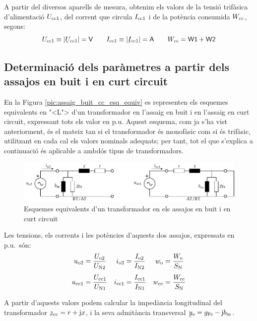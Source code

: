A partir del diversos aparells de mesura, obtenim els valors de la
tensi\'{o} trif\`{a}sica d'alimentaci\'{o} $U_\mathrm{cc1}$, del corrent que circula
$I_\mathrm{cc1}$ i de la pot\`{e}ncia consumida $W_\mathrm{cc}$, segons:
\begin{equation}
    U\ped{cc1}\equiv|\cmplx{U}\ped{cc1}|=\textsf{V} \qquad
    I\ped{cc1}\equiv|\cmplx{I}\ped{cc1}|=\textsf{A} \qquad
    W\ped{cc}=\textsf{W1}+\textsf{W2}
\end{equation}

\subsection{Determinaci\'{o} dels par\`{a}metres a partir dels assajos en buit i en curt circuit}

En la Figura \vref{pic:assaig_buit_cc_esq_equiv}  es representen els
esquemes equivalents en {"<}L{">} d'un transformador en l'assaig en buit i
en l'assaig en curt circuit, expressant tots els valor en p.u.
Aquest esquema, com ja s'ha vist anteriorment, \'{e}s el mateix tan si
el transformador \'{e}s monof\`{a}sic com si \'{e}s trif\`{a}sic, utilitzant en cada
cal els valors nominals adequats; per tant, tot el que s'explica  a
continuaci\'{o} \'{e}s aplicable a ambd\'{o}s tipus de transformadors.

\begin{figure}[htb]
\centering
    \includegraphics{Imatges/Cap-TrafosPot-Assaig-Buit-CC-Esq-Equiv.pdf}
\caption{Esquemes equivalents d'un transformador en els assajos en
buit i en curt circuit} \label{pic:assaig_buit_cc_esq_equiv}
\end{figure}

Les tensions, els corrents i les pot\`{e}ncies d'aquests dos  assajos,
expressats en p.u.\ s\'{o}n:
\begin{align}
    u_\mathrm{o2} &=\frac{U_\mathrm{o2}}{U_\mathrm{N2}} &
    i_\mathrm{o2} &=\frac{I_\mathrm{o2}}{I_\mathrm{N2}} &
    w_\mathrm{o}  &=\frac{W_\mathrm{o}}{S_\mathrm{N}} \\[1ex]
    u_\mathrm{cc1} &=\frac{U_\mathrm{cc1}}{U_\mathrm{N1}} &
    i_\mathrm{cc1} &=\frac{I_\mathrm{cc1}}{I_\mathrm{N1}} &
    w_\mathrm{cc} &=\frac{W_\mathrm{cc}}{S_\mathrm{N}}
\end{align}

A partir d'aquests valors podem calcular la imped\`{a}ncia longitudinal
del transformador $\cmplx{z}\ped{cc}=r+\ju x$, i la seva admit\`{a}ncia
transversal $\cmplx{y}\ped{o}=g\ped{Fe}-\ju b\ped{m}$.

